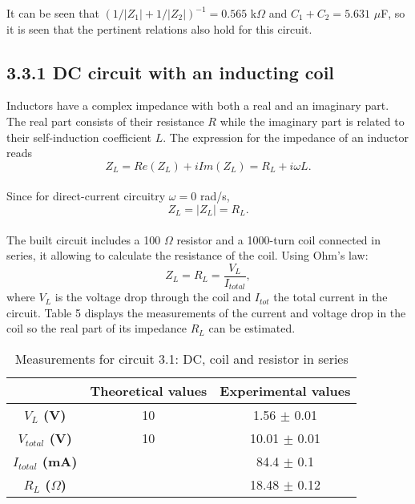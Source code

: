 \documentclass[a4paper, 12pt]{article}
\begin{document}
It can be seen that $(1/|Z_1| + 1/|Z_2|)^{-1} =  0.565 $ k$\Omega$ and $C_1 + C_2 = 5.631 $ $\mu$F, so it is seen that the pertinent relations also hold for this circuit.
\subsection{3.3.1 DC circuit with an inducting coil}
Inductors have a complex impedance with both a real and an imaginary part. The real part consists of their resistance $R$ while the imaginary part is related to their self-induction coefficient $L$. The expression for the impedance of an inductor reads
\begin{equation}\label{zldc}
	Z_L = Re(Z_L) + iIm(Z_L) = R_L + i\omega L.
\end{equation}\\

 Since for direct-current circuitry $\omega = 0$ rad/s, 
 \begin{equation}\label{rl}
 	Z_L = |Z_L| = R_L.
 \end{equation}\\

The built circuit includes a 100 $\Omega$ resistor and a 1000-turn coil connected in series, it allowing to calculate the resistance of the coil. Using Ohm's law:
\begin{equation}\label{zlohm}
	Z_L = R_L = \frac{V_L}{I_{total}},
\end{equation} 
where $V_L$ is the voltage drop through the coil and $I_{tot}$ the total current in the circuit.
Table 5 displays the measurements of the current and voltage drop in the coil so the real part of its impedance $R_L$ can be estimated. 
\begin{table}[hbt!]
	\centering
	\begin{tabular}{|c|c|c|}
		\hline
		& \textbf{Theoretical values} & \textbf{Experimental values} \\
		\hline
		\textbf{$V_{L}$ (V)} & 10 & 1.56 $\pm$ 0.01 \\
		\textbf{$V_{total}$ (V)} & 10 & 10.01 $\pm$ 0.01\\
		\hline
		\textbf{$I_{total}$ (mA)} & & 84.4 $\pm$ 0.1 \\
		\hline
		\textbf{$R_{L}$ ($\Omega$)} &  & 18.48 $\pm$ 0.12 \\
		\hline
	\end{tabular}
	\caption{Measurements for circuit 3.1: DC, coil and resistor in series}
\end{table}
\end{document}
